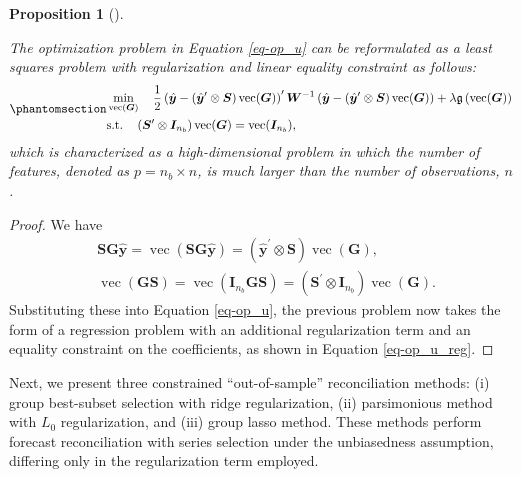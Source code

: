 \documentclass[
  11pt]{article}
\theoremstyle{plain}
\newtheorem{proposition}{Proposition}[section]
\theoremstyle{remark}
\begin{document}
\begin{proposition}[]\protect\hypertarget{prp-2}{}\label{prp-2}

The optimization problem in Equation \eqref{eq-op_u} can be reformulated
as a least squares problem with regularization and linear equality
constraint as follows:
\begin{equation}\phantomsection\label{eq-op_u_reg}{
\begin{aligned}
& \min_{\operatorname{vec}(\bm{G})} \quad \frac{1}{2}\left(\hat{\bm{y}}-\left(\hat{\bm{y}}^{\prime} \otimes \bm{S}\right) \operatorname{vec}(\bm{G})\right)^{\prime} \bm{W}^{-1}\left(\hat{\bm{y}}-\left(\hat{\bm{y}}^{\prime} \otimes \bm{S}\right) \operatorname{vec}(\bm{G})\right) + \lambda\mathfrak{g}\left(\operatorname{vec}(\bm{G})\right) \\
& \text{s.t.} \quad \left(\bm{S}^{\prime} \otimes \bm{I}_{n_b}\right) \operatorname{vec}(\bm{G})=\operatorname{vec}(\bm{I}_{n_b}),
\end{aligned}
}\end{equation} which is characterized as a high-dimensional problem in
which the number of features, denoted as \(p = n_b \times n\), is much
larger than the number of observations, \(n\).

\end{proposition}

\begin{proof}
We have\vspace*{-0.4cm}\enlargethispage{0.4cm} \[
\begin{aligned}
& \bm{SG}\hat{\bm{y}} = \operatorname{vec}\left(\bm{SG}\hat{\bm{y}}\right) = \left(\hat{\bm{y}}^{\prime} \otimes \bm{S}\right) \operatorname{vec}(\bm{G}), \\
& \operatorname{vec}\left(\bm{G}\bm{S}\right) = \operatorname{vec}\left(\bm{I}_{n_b}\bm{G}\bm{S}\right) = \left(\bm{S}^{\prime} \otimes \bm{I}_{n_b}\right) \operatorname{vec}(\bm{G}).
\end{aligned}
\] Substituting these into Equation \eqref{eq-op_u}, the previous
problem now takes the form of a regression problem with an additional
regularization term and an equality constraint on the coefficients, as
shown in Equation \eqref{eq-op_u_reg}.
\end{proof}

Next, we present three constrained ``out-of-sample'' reconciliation
methods: (i) group best-subset selection with ridge regularization, (ii)
parsimonious method with \(L_0\) regularization, and (iii) group lasso
method. These methods perform forecast reconciliation with series
selection under the unbiasedness assumption, differing only in the
regularization term employed.
\end{document}
